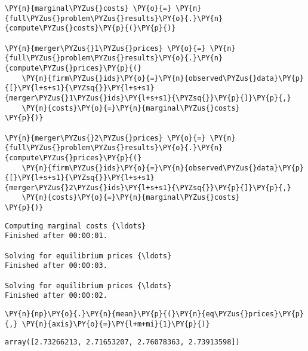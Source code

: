     \begin{tcolorbox}[breakable, size=fbox, boxrule=1pt, pad at break*=1mm,colback=cellbackground, colframe=cellborder]
\begin{Verbatim}[commandchars=\\\{\}]
\PY{n}{marginal\PYZus{}costs} \PY{o}{=} \PY{n}{full\PYZus{}problem\PYZus{}results}\PY{o}{.}\PY{n}{compute\PYZus{}costs}\PY{p}{(}\PY{p}{)}

\PY{n}{merger\PYZus{}1\PYZus{}prices} \PY{o}{=} \PY{n}{full\PYZus{}problem\PYZus{}results}\PY{o}{.}\PY{n}{compute\PYZus{}prices}\PY{p}{(}
    \PY{n}{firm\PYZus{}ids}\PY{o}{=}\PY{n}{observed\PYZus{}data}\PY{p}{[}\PY{l+s+s1}{\PYZsq{}}\PY{l+s+s1}{merger\PYZus{}1\PYZus{}ids}\PY{l+s+s1}{\PYZsq{}}\PY{p}{]}\PY{p}{,}
    \PY{n}{costs}\PY{o}{=}\PY{n}{marginal\PYZus{}costs}
\PY{p}{)}

\PY{n}{merger\PYZus{}2\PYZus{}prices} \PY{o}{=} \PY{n}{full\PYZus{}problem\PYZus{}results}\PY{o}{.}\PY{n}{compute\PYZus{}prices}\PY{p}{(}
    \PY{n}{firm\PYZus{}ids}\PY{o}{=}\PY{n}{observed\PYZus{}data}\PY{p}{[}\PY{l+s+s1}{\PYZsq{}}\PY{l+s+s1}{merger\PYZus{}2\PYZus{}ids}\PY{l+s+s1}{\PYZsq{}}\PY{p}{]}\PY{p}{,}
    \PY{n}{costs}\PY{o}{=}\PY{n}{marginal\PYZus{}costs}
\PY{p}{)}
\end{Verbatim}
\end{tcolorbox}

    \begin{Verbatim}[commandchars=\\\{\}]
Computing marginal costs {\ldots}
Finished after 00:00:01.

Solving for equilibrium prices {\ldots}
Finished after 00:00:03.

Solving for equilibrium prices {\ldots}
Finished after 00:00:02.

    \end{Verbatim}

    \begin{tcolorbox}[breakable, size=fbox, boxrule=1pt, pad at break*=1mm,colback=cellbackground, colframe=cellborder]
\begin{Verbatim}[commandchars=\\\{\}]
\PY{n}{np}\PY{o}{.}\PY{n}{mean}\PY{p}{(}\PY{n}{eq\PYZus{}prices}\PY{p}{,} \PY{n}{axis}\PY{o}{=}\PY{l+m+mi}{1}\PY{p}{)}
\end{Verbatim}
\end{tcolorbox}

            \begin{tcolorbox}[breakable, size=fbox, boxrule=.5pt, pad at break*=1mm, opacityfill=0]
\begin{Verbatim}[commandchars=\\\{\}]
array([2.73266213, 2.71653207, 2.76078363, 2.73913598])
\end{Verbatim}
\end{tcolorbox}


